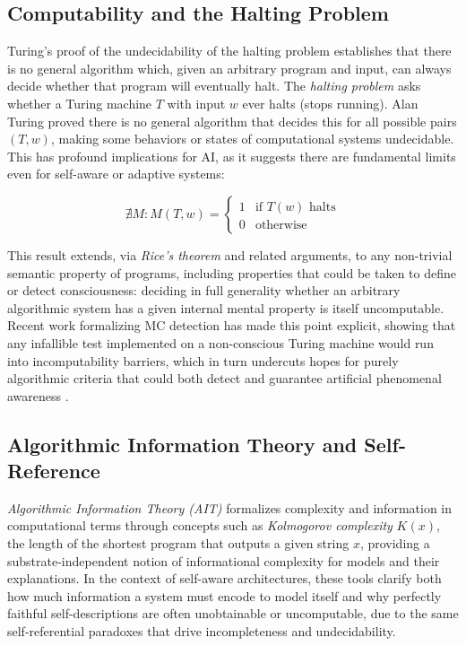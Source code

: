 \subsection{Computability and the Halting Problem}
\label{subsec:halting_problem}

Turing's proof of the undecidability of the halting problem establishes that there is no general algorithm which, given an arbitrary program and input, can always decide whether that program will eventually halt. The \emph{halting problem} asks whether a Turing machine $T$ with input $w$ ever halts (stops running). Alan Turing proved there is no general algorithm that decides this for all possible pairs $(T,w)$, making some behaviors or states of computational systems undecidable. This has profound implications for AI, as it suggests there are fundamental limits even for self-aware or adaptive systems:

\vspace{-1.5\baselineskip}
\begin{equation}
\nexists M : M(T,w) = \begin{cases}
 1 & \text{if } T(w) \text{ halts} \\
 0 & \text{otherwise}
\end{cases}
\label{eq:halting_undecidable}
\end{equation}
\vspace{-1.5\baselineskip}

This result extends, via \emph{Rice's theorem} and related arguments, to any non-trivial semantic property of programs, including properties that could be taken to define or detect consciousness: deciding in full generality whether an arbitrary algorithmic system has a given internal mental property is itself uncomputable. Recent work formalizing MC detection has made this point explicit, showing that any infallible test implemented on a non-conscious Turing machine would run into incomputability barriers, which in turn undercuts hopes for purely algorithmic criteria that could both detect and guarantee artificial phenomenal awareness \cite{garridomerchan2024machine,kozen1997rice,soare1996computability}.

\subsection{Algorithmic Information Theory and Self-Reference}
\label{subsec:ait_self_reference}

\emph{Algorithmic Information Theory (AIT)} formalizes complexity and information in computational terms through concepts such as \emph{Kolmogorov complexity} $K(x)$, the length of the shortest program that outputs a given string $x$, providing a substrate-independent notion of informational complexity for models and their explanations. In the context of self-aware architectures, these tools clarify both how much information a system must encode to model itself and why perfectly faithful self-descriptions are often unobtainable or uncomputable, due to the same self-referential paradoxes that drive incompleteness and undecidability. 

